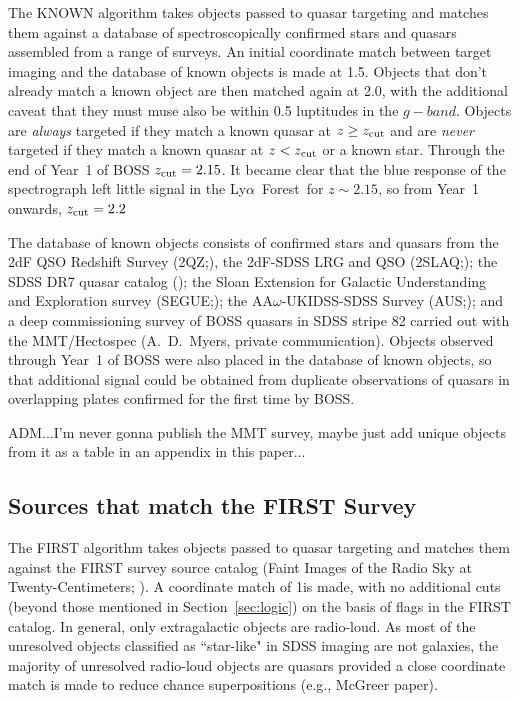 \documentclass{emulateapj}
\newcommand{\Lyaf}{Ly$\alpha$~Forest~}
\begin{document}
The KNOWN algorithm takes objects passed to quasar targeting and matches
them against a database of spectroscopically confirmed stars and quasars
assembled from a range of surveys. An initial coordinate match between
target imaging and the database of known objects is made at 1.5\arcsec.
Objects that don't already match a known object are then matched again
at 2.0\arcsec, with the additional caveat that they must muse also be
within 0.5 luptitudes in the $g-band$. Objects are {\em always} targeted
if they match a known quasar at $z \ge z_{\rm cut}$ and are {\em never}
targeted if they match a known quasar at $z < z_{\rm cut}$ or a known
star. Through the end of Year~1 of BOSS $z_{\rm cut}=2.15$. It became
clear that the blue response of the spectrograph left little signal in
the \Lyaf for $z\sim2.15$, so from Year~1 onwards, $z_{\rm cut}=2.2$

The database of known objects consists of confirmed stars and quasars
from the 2dF QSO Redshift Survey (2QZ;), the 2dF-SDSS LRG and QSO
(2SLAQ;); the SDSS DR7 quasar catalog (); the Sloan Extension
for Galactic Understanding and Exploration survey (SEGUE;); the
AA$\omega$-UKIDSS-SDSS Survey (AUS;); and a deep commissioning survey
of BOSS quasars in SDSS stripe 82 carried out with the MMT/Hectospec
(A.~D.~Myers, private communication). Objects observed through Year~1
of BOSS were also placed in the database of known objects, so that
additional signal could be obtained from duplicate observations of
quasars in overlapping plates confirmed for the first time by BOSS.

ADM...I'm never gonna publish the MMT survey, maybe just add unique
objects from it as a table in an appendix in this paper...

\subsection{Sources that match the FIRST Survey}

The FIRST algorithm takes objects passed to quasar targeting and
matches them against the FIRST survey source catalog (Faint Images
of the Radio Sky at Twenty-Centimeters; ). A coordinate match of
1\arcsec is made, with no additional cuts (beyond those mentioned in
Section~\ref{sec:logic}) on the basis of flags in the FIRST catalog.
In general, only extragalactic objects are radio-loud. As most of
the unresolved objects classified as ``star-like" in SDSS imaging
are not galaxies, the majority of unresolved radio-loud objects are
quasars provided a close coordinate match is made to reduce chance
superpositions (e.g., McGreer paper).
\end{document}
